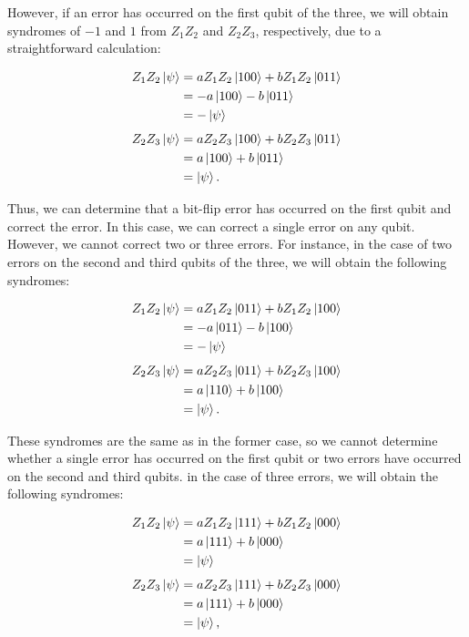 \documentclass[a4paper,11pt]{ltjsarticle}
\begin{document}
{{{            However, if an error has occurred on the first qubit of the three, we will obtain syndromes of $-1$ and $1$ from $Z_1 Z_2$ and $Z_2 Z_3$, respectively, due to a straightforward calculation:

            \begin{align*}
                Z_1Z_2\ket{\psi} &= aZ_1Z_2\ket{100}+bZ_1Z_2\ket{011}\\
                &= -a\ket{100}-b\ket{011}\\
                &= -\ket{\psi}
            \end{align*}
            \begin{align*}
                Z_2 Z_3\ket{\psi} &= aZ_2Z_3\ket{100}+bZ_2Z_3\ket{011}\\
                &= a\ket{100}+b\ket{011}\\
                &= \ket{\psi}.
            \end{align*}

            Thus, we can determine that a bit-flip error has occurred on the first qubit and correct the error. In this case, we can correct a single error on any qubit. However, we cannot correct two or three errors. For instance, in the case of two errors on the second and third qubits of the three, we will obtain the following syndromes:

            \begin{align*}
                Z_1Z_2\ket{\psi} &= aZ_1Z_2\ket{011}+bZ_1Z_2\ket{100}\\
                &= -a\ket{011}-b\ket{100}\\
                &= -\ket{\psi}
            \end{align*}
            \begin{align*}
                Z_2 Z_3\ket{\psi} &= aZ_2Z_3\ket{011}+bZ_2Z_3\ket{100}\\
                &= a\ket{110}+b\ket{100}\\
                &= \ket{\psi}.
            \end{align*}

            These syndromes are the same as in the former case, so we cannot determine whether a single error has occurred on the first qubit or two errors have occurred on the second and third qubits. in the case of three errors, we will obtain the following syndromes:

            \begin{align*}
                Z_1Z_2\ket{\psi} &= aZ_1Z_2\ket{111}+bZ_1Z_2\ket{000}\\
                &= a\ket{111}+b\ket{000}\\
                &= \ket{\psi}
            \end{align*}
            \begin{align*}
                Z_2 Z_3\ket{\psi} &= aZ_2Z_3\ket{111}+bZ_2Z_3\ket{000}\\
                &= a\ket{111}+b\ket{000}\\
                &= \ket{\psi},
            \end{align*}

}}}
\end{document}
